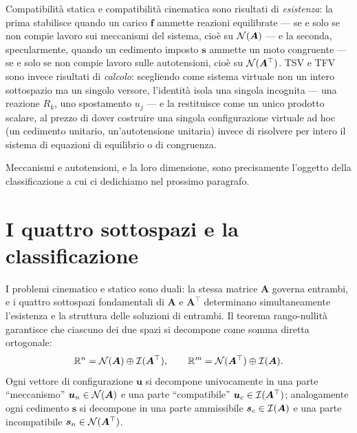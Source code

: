 Compatibilità statica e compatibilità cinematica sono risultati
di \emph{esistenza}: la prima stabilisce quando un carico $\bm
f$ ammette reazioni equilibrate --- se e solo se non compie
lavoro sui meccanismi del sistema, cioè su $\mathcal{N}(\bm A)$ --- e la
seconda, specularmente, quando un cedimento imposto $\bm s$
ammette un moto congruente --- se e solo se non compie lavoro
sulle autotensioni, cioè su $\mathcal{N}(\bm A^\top)$. TSV e TFV sono
invece risultati di \emph{calcolo}: scegliendo come sistema
virtuale non un intero sottospazio ma un singolo versore,
l'identità isola una singola incognita --- una reazione $R_k$,
uno spostamento $u_j$ --- e la restituisce come un unico
prodotto scalare, al prezzo di dover costruire una singola
configurazione virtuale ad hoc (un cedimento unitario,
un'autotensione unitaria) invece di risolvere per intero il
sistema di equazioni di equilibrio o di congruenza.

Meccanismi e autotensioni, e la loro dimensione, sono
precisamente l'oggetto della classificazione a cui ci dedichiamo
nel prossimo paragrafo.


\section{I quattro sottospazi e la classificazione}\label{sec:quattro}

I problemi cinematico e statico sono duali: la stessa matrice $\bm{A}$
governa entrambi, e i quattro sottospazi fondamentali di $\bm{A}$ e
$\bm{A}^\top$ determinano simultaneamente l'esistenza e la struttura
delle soluzioni di entrambi. Il teorema rango-nullità garantisce che
ciascuno dei due spazi si decompone come somma diretta ortogonale:
\begin{equation}
	\mathbb{R}^{n} = \mathcal{N}(\bm{A}) \oplus \mathcal{I}(\bm{A}^{\top}), \qquad
	\mathbb{R}^{m} = \mathcal{N}(\bm{A}^{\top}) \oplus \mathcal{I}(\bm{A}).
\end{equation}
Ogni vettore di configurazione $\bm{u}$ si decompone univocamente in
una parte ``meccanismo'' $\bm{u}_n \in \mathcal{N}(\bm{A})$ e una parte
``compatibile'' $\bm{u}_c \in \mathcal{I}(\bm{A}^\top)$; analogamente ogni
cedimento $\bm{s}$ si decompone in una parte ammissibile
$\bm{s}_c \in \mathcal{I}(\bm{A})$ e una parte incompatibile
$\bm{s}_n \in \mathcal{N}(\bm{A}^\top)$.


